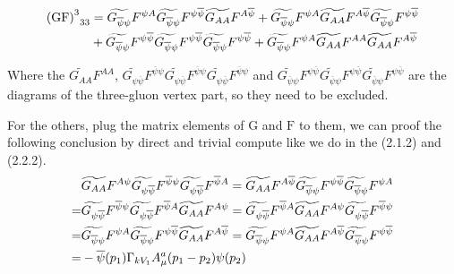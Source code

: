 \documentclass[UTF8]{ctexart}
\begin{document}
\begin{align}
\mathrm{{(GF)}^3}_{33}
&=\widetilde{G_{\overline{\psi}\psi}}F^{\psi A}\widetilde{G_{\overline{\psi}\psi}}F^{\psi\overline{\psi}}\widetilde{G_{AA}}F^{A\overline{\psi}}+\widetilde{G_{\overline{\psi}\psi}}F^{\psi A}\widetilde{G_{AA}}F^{A\overline{\psi}}\widetilde{G_{\overline{\psi}\psi}}F^{\psi\overline{\psi}}
\notag\\&+\widetilde{G_{\overline{\psi}\psi}}F^{\psi\overline{\psi}}\widetilde{G_{\overline{\psi}\psi}}F^{\psi\overline{\psi}}\widetilde{G_{\overline{\psi}\psi}}F^{\psi\overline{\psi}}+\widetilde{G_{\overline{\psi}\psi}}F^{\psi A}\widetilde{G_{AA}}F^{AA}\widetilde{G_{AA}}F^{A\overline{\psi}}
\end{align}
\par Where the $\widetilde{G_{AA}}F^{AA}$, $\widetilde{G_{\psi\overline{\psi}}}F^{\overline{\psi}\psi}\widetilde{G_{\psi\overline{\psi}}}F^{\overline{\psi}\psi}\widetilde{G_{\psi\overline{\psi}}}F^{\overline{\psi}\psi}$ and $\widetilde{G_{\overline{\psi}\psi}}F^{\psi\overline{\psi}}\widetilde{G_{\overline{\psi}\psi}}F^{\psi\overline{\psi}}\widetilde{G_{\overline{\psi}\psi}}F^{\psi\overline{\psi}}$ are the diagrams of the three-gluon vertex part, so they need to be excluded.
\par For the others, plug the matrix elements of $\mathrm{G}$ and $\mathrm{F}$ to them, we can proof the following conclusion by direct and trivial compute like we do in the (2.1.2) and (2.2.2).
\begin{align}
&\widetilde{G_{AA}}F^{A\psi}\widetilde{G_{\psi\overline{\psi}}}F^{\overline{\psi}\psi}\widetilde{G_{\psi\overline{\psi}}}F^{\overline{\psi}A}=\widetilde{G_{AA}}F^{A\overline{\psi}}\widetilde{G_{\overline{\psi}\psi}}F^{\psi\overline{\psi}}\widetilde{G_{\overline{\psi}\psi}}F^{\psi A}
\notag\\=&\widetilde{G_{\psi\overline{\psi}}}F^{\overline{\psi}\psi}\widetilde{G_{\psi\overline{\psi}}}F^{\overline{\psi}A}\widetilde{G_{AA}}F^{A\psi}=\widetilde{G_{\psi\overline{\psi}}}F^{\overline{\psi}A}\widetilde{G_{AA}}F^{A\psi}\widetilde{G_{\psi\overline{\psi}}}F^{\overline{\psi}\psi}
\notag\\=&\widetilde{G_{\overline{\psi}\psi}}F^{\psi A}\widetilde{G_{\overline{\psi}\psi}}F^{\psi\overline{\psi}}\widetilde{G_{AA}}F^{A\overline{\psi}}=\widetilde{G_{\overline{\psi}\psi}}F^{\psi A}\widetilde{G_{AA}}F^{A\overline{\psi}}\widetilde{G_{\overline{\psi}\psi}}F^{\psi\overline{\psi}}
\notag\\=&-\overline{\psi}(p_1)\Gamma_{kV_1}A_{\mu}^{a}(p_1-p_2)\psi(p_2)
\end{align} 
\end{document}
